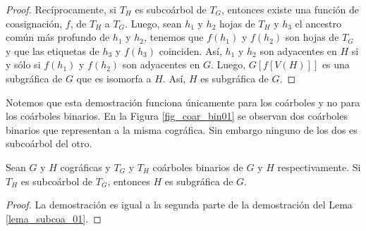 \begin{proof}
  Rec\'iprocamente, si $T_H$ es subcoárbol de $T_G$, entonces existe
  una función de coasignación, $f$, de $T_H$ a $T_G$. Luego, sean $h_1$ y
  $h_2$ hojas de $T_H$ y $h_3$ el ancestro común más profundo de $h_1$ y
  $h_2$, tenemos que $f(h_1)$ y $f(h_2)$ son hojas de $T_G$ y que las
  etiquetas de $h_3$ y $f(h_3)$ coinciden. Así, $h_1$ y $h_2$ son adyacentes
  en $H$ si y sólo si $f(h_1)$ y $f(h_2)$ son adyacentes en $G$. Luego,
  $G[f[V(H)]]$ es una subgráfica de $G$ que es isomorfa a $H$. Así, $H$
  es subgráfica de $G$.

\end{proof}

Notemos que esta demostración funciona únicamente para los coárboles y no para los coárboles binarios. En la Figura \ref{fig_coar_bin01} se observan dos coárboles binarios que representan a la misma cográfica. Sin embargo ninguno de los dos es subcoárbol del otro.

\begin{lemma}
    Sean $G$ y $H$ cográficas y $T_G$ y $T_H$ coárboles binarios de $G$ y $H$ respectivamente. Si $T_H$ es subcoárbol de $T_G$, entonces $H$ es subgráfica de $G$.
\end{lemma}

\begin{proof}
    La demostración es igual a la segunda parte de la demostración del Lema \ref{lema_subcoa_01}.
\end{proof}
